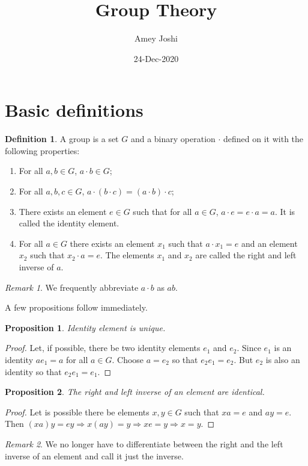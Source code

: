 \documentclass{article}
\title{Group Theory}
\author{Amey Joshi}
\date{24-Dec-2020}
\theoremstyle{plain}
\numberwithin{thm}{section}
\theoremstyle{plain}
\newtheorem{prop}{Proposition}
\numberwithin{prop}{section}
\theoremstyle{definition}
\newtheorem{defn}{Definition}
\numberwithin{defn}{section}
\theoremstyle{remark}
\newtheorem*{rem}{Remark}
\numberwithin{equation}{section}
\begin{document}
\maketitle
\section{Basic definitions}\label{s1}
\begin{defn}\label{s1d1}
A group is a set $G$ and a binary operation $\cdot$ defined on it with the
following properties:
\begin{enumerate}
\item For all $a, b \in G$, $a \cdot b \in G$;
\item For all $a, b, c \in G$, $a \cdot (b \cdot c)= (a \cdot b) \cdot c$;
\item There exists an element $e \in G$ such that for all $a \in G$, $a \cdot e
= e \cdot a = a$. It is called the identity element.
\item For all $a \in G$ there exists an element $x_1$ such that $a \cdot x_1 = e$
and an element $x_2$ such that $x_2 \cdot a = e$. The elements $x_1$ and $x_2$ 
are called the right and left inverse of $a$.
\end{enumerate}
\end{defn}
\begin{rem}
We frequently abbreviate $a \cdot b$ as $ab$.
\end{rem}

A few propositions follow immediately.
\begin{prop}\label{s1p1}
Identity element is unique.
\end{prop}
\begin{proof}
Let, if possible, there be two identity elements $e_1$ and $e_2$. Since $e_1$
is an identity $a e_1 = a$ for all $a \in G$. Choose $a = e_2$ so that $e_2
e_1 = e_2$. But $e_2$ is also an identity so that $e_2 e_1 = e_1$.
\end{proof}

\begin{prop}\label{s1p2}
The right and left inverse of an element are identical.
\end{prop}
\begin{proof}
Let is possible there be elements $x, y \in G$ such that $xa = e$ and $ay = e$.
Then $(xa)y = ey \Rightarrow x(ay) = y \Rightarrow xe = y \Rightarrow x = y$.
\end{proof}

\begin{rem}
We no longer have to differentiate between the right and the left inverse of 
an element and call it just the inverse.
\end{rem}
\end{document}
